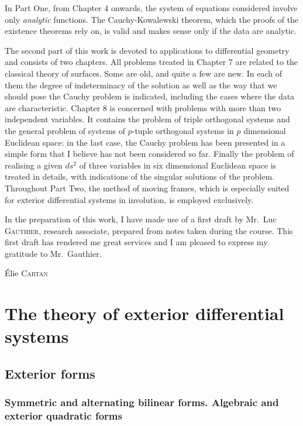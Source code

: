 \documentclass[leqno,11pt]{book}
\numberwithin{equation}{chapter}
\theoremstyle{shape1}
\theoremstyle{shape0}
\theoremstyle{shape2}
\theoremstyle{definition}
\begin{document}
In Part One, from Chapter 4 onwards, the system of equations considered involve only \emph{analytic} functions. The Cauchy-Kowalewski theorem, which the proofs of the existence theorems rely on, is valid and makes sense only if the data are analytic.

The second part of this work is devoted to applications to differential geometry and consists of two chapters. All problems treated in Chapter 7 are related to the classical theory of surfaces. Some are old, and quite a few are new. In each of them the degree of indeterminacy of the solution as well as the way that we should pose the Cauchy problem is indicated, including the cases where the data are characteristic. Chapter 8 is concerned with problems with more than two independent variables. It contains the problem of triple orthogonal systems and the general problem of systems of $p$-tuple orthogonal systems in $p$ dimensional Euclidean space: in the last case, the Cauchy problem has been presented in a simple form that I believe has not been considered so far. Finally the problem of realising a given $ds^{2}$ of three variables in six dimensional Euclidean space is treated in details, with indications of the singular solutions of the problem. Throughout Part Two, the method of moving frames, which is especially suited for exterior differential systems in involution, is employed exclusively.

In the preparation of this work, I have made use of a first draft by Mr.~Luc \textsc{Gauthier}, research associate, prepared from notes taken during the course. This first draft has rendered  me great services and I am pleased to express my gratitude to Mr.~Gauthier.

\hfill \'Elie \textsc{Cartan}

{\small
\tableofcontents
}

\part{The theory of exterior differential systems}
\label{part:theory-exter-diff}

\chapter{Exterior forms}
\label{cha:exterior-forms}

\section{Symmetric and alternating bilinear forms. Algebraic and exterior quadratic forms}
\label{sec:symm-altern-bilin}
\end{document}
